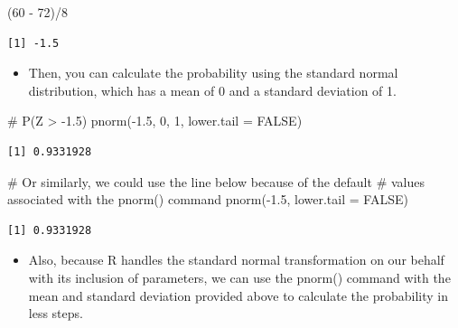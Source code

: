 \documentclass[
  letterpaper,
  DIV=11,
  numbers=noendperiod]{scrreprt}
\newenvironment{Shaded}{\begin{snugshade}}{\end{snugshade}}
\newcommand{\AttributeTok}[1]{\textcolor[rgb]{0.40,0.45,0.13}{#1}}
\newcommand{\CommentTok}[1]{\textcolor[rgb]{0.37,0.37,0.37}{#1}}
\newcommand{\ConstantTok}[1]{\textcolor[rgb]{0.56,0.35,0.01}{#1}}
\newcommand{\DecValTok}[1]{\textcolor[rgb]{0.68,0.00,0.00}{#1}}
\newcommand{\FloatTok}[1]{\textcolor[rgb]{0.68,0.00,0.00}{#1}}
\newcommand{\FunctionTok}[1]{\textcolor[rgb]{0.28,0.35,0.67}{#1}}
\newcommand{\NormalTok}[1]{\textcolor[rgb]{0.00,0.23,0.31}{#1}}
\newcommand{\SpecialCharTok}[1]{\textcolor[rgb]{0.37,0.37,0.37}{#1}}
\providecommand{\tightlist}{%
  \setlength{\itemsep}{0pt}\setlength{\parskip}{0pt}}\usepackage{longtable,booktabs,array}
\begin{document}
\begin{Shaded}
\begin{Highlighting}[]
\NormalTok{(}\DecValTok{60} \SpecialCharTok{{-}} \DecValTok{72}\NormalTok{)}\SpecialCharTok{/}\DecValTok{8}
\end{Highlighting}
\end{Shaded}

\begin{verbatim}
[1] -1.5
\end{verbatim}

\begin{itemize}
\tightlist
\item
  Then, you can calculate the probability using the standard normal
  distribution, which has a mean of 0 and a standard deviation of 1.
\end{itemize}

\begin{Shaded}
\begin{Highlighting}[]
\CommentTok{\# P(Z \textgreater{} {-}1.5)}
\FunctionTok{pnorm}\NormalTok{(}\SpecialCharTok{{-}}\FloatTok{1.5}\NormalTok{, }\DecValTok{0}\NormalTok{, }\DecValTok{1}\NormalTok{, }\AttributeTok{lower.tail =} \ConstantTok{FALSE}\NormalTok{)}
\end{Highlighting}
\end{Shaded}

\begin{verbatim}
[1] 0.9331928
\end{verbatim}

\begin{Shaded}
\begin{Highlighting}[]
\CommentTok{\# Or similarly, we could use the line below because of the default}
\CommentTok{\# values associated with the pnorm() command}
\FunctionTok{pnorm}\NormalTok{(}\SpecialCharTok{{-}}\FloatTok{1.5}\NormalTok{, }\AttributeTok{lower.tail =} \ConstantTok{FALSE}\NormalTok{)}
\end{Highlighting}
\end{Shaded}

\begin{verbatim}
[1] 0.9331928
\end{verbatim}

\begin{itemize}
\tightlist
\item
  Also, because R handles the standard normal transformation on our
  behalf with its inclusion of parameters, we can use the pnorm()
  command with the mean and standard deviation provided above to
  calculate the probability in less steps.
\end{itemize}
\end{document}
